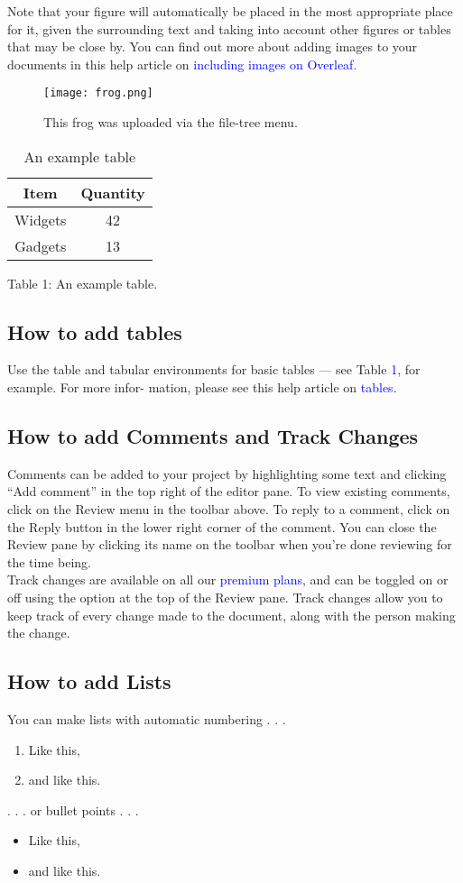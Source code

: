 \documentclass{article}
\begin{document}
Note that your figure will automatically be placed in the most appropriate place for it, given the
surrounding text and taking into account other figures or tables that may be close by. You can find
out more about adding images to your documents in this help article on \textcolor{blue}{including images on Overleaf.}\\
\begin{figure}
	\centering
	\texttt{[image: frog.png]}
	\caption{This frog was uploaded via the file-tree menu.}
	\label{fig:example}	
\end{figure}
\begin{table}[h]
	\centering
	\begin{tabular}{|c|c|}
	
		Item & Quantity\\
		\hline
		Widgets& 42\\
		Gadgets & 13\\
		
	\end{tabular}
	\caption{An example table}
\end{table}
Table 1: An example table.
\subsection{How to add tables}
Use the table and tabular environments for basic tables — see Table \textcolor{blue}{1}, for example. For more infor-
mation, please see this help article on \textcolor{blue}{tables}.
\subsection{How to add Comments and Track Changes}
Comments can be added to your project by highlighting some text and clicking “Add comment” in
the top right of the editor pane. To view existing comments, click on the Review menu in the toolbar
above. To reply to a comment, click on the Reply button in the lower right corner of the comment.
You can close the Review pane by clicking its name on the toolbar when you’re done reviewing for the
time being.\\

Track changes are available on all our \textcolor{blue}{premium plans}, and can be toggled on or off using the option
at the top of the Review pane. Track changes allow you to keep track of every change made to the
document, along with the person making the change.

\subsection{How to add Lists}
You can make lists with automatic numbering . . .
\begin{enumerate}
	\item Like this,
	\item and like this.
\end{enumerate}
. . . or bullet points . . .$  $
\begin{itemize}
	\item Like this,
	\item and like this.
\end{itemize}
\end{document}
